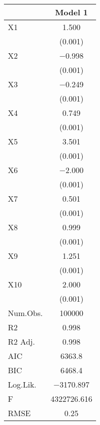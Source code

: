 \documentclass{article}
\begin{document}
\begin{table}
\centering
\begin{tabular}[t]{lc}
\toprule
  & Model 1\\
\midrule
X1 & \num{1.500}\\
 & \vphantom{9} (\num{0.001})\\
X2 & \num{-0.998}\\
 & \vphantom{8} (\num{0.001})\\
X3 & \num{-0.249}\\
 & \vphantom{7} (\num{0.001})\\
X4 & \num{0.749}\\
 & \vphantom{6} (\num{0.001})\\
X5 & \num{3.501}\\
 & \vphantom{5} (\num{0.001})\\
X6 & \num{-2.000}\\
 & \vphantom{4} (\num{0.001})\\
X7 & \num{0.501}\\
 & \vphantom{3} (\num{0.001})\\
X8 & \num{0.999}\\
 & \vphantom{2} (\num{0.001})\\
X9 & \num{1.251}\\
 & \vphantom{1} (\num{0.001})\\
X10 & \num{2.000}\\
 & (\num{0.001})\\
\midrule
Num.Obs. & \num{100000}\\
R2 & \num{0.998}\\
R2 Adj. & \num{0.998}\\
AIC & \num{6363.8}\\
BIC & \num{6468.4}\\
Log.Lik. & \num{-3170.897}\\
F & \num{4322726.616}\\
RMSE & \num{0.25}\\
\bottomrule
\end{tabular}
\end{table}
\end{document}
